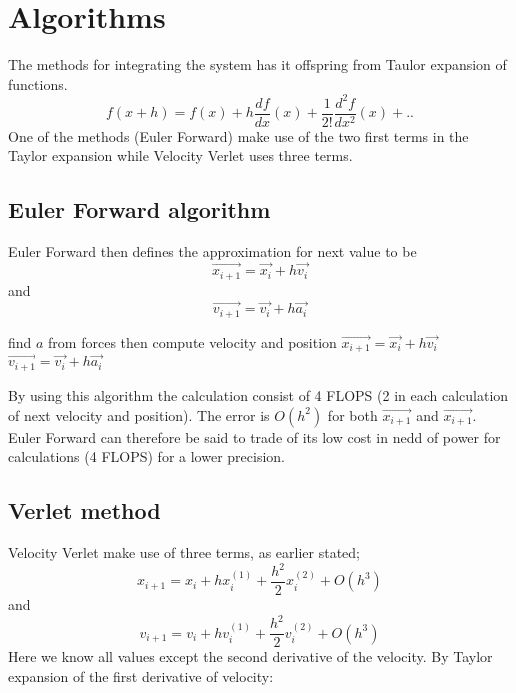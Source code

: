 \documentclass[twoside,twocolumn]{article}
\begin{document}
\section{Algorithms}
The methods for integrating the system has it offspring from Taulor expansion of functions. 
\[
f(x+h) = f(x) +h\frac{df}{dx}(x)+\frac{1}{2!}\frac{d^2f}{dx^2}(x) +..
\]
One of the methods (Euler Forward) make use of the two first terms in the Taylor expansion while Velocity Verlet uses three terms. 
\subsection{Euler Forward algorithm}
Euler Forward then defines the approximation for next value to be
\begin{equation}
\vec{  x_{i+1}} = \vec{x_{i}} + h \vec{v_i}
\end{equation}
and
\begin{equation}
\vec{  v_{i+1}} = \vec{v_{i}} + h \vec{a_i}
\end{equation}

\begin{algorithmic}[H]

\State find $a$ from forces
\State then compute velocity and position
\State $\vec{  x_{i+1}} = \vec{x_{i}} + h \vec{v_i}$
\State $\vec{  v_{i+1}} = \vec{v_{i}} + h \vec{a_i}$
\EndFor
\end{algorithmic}
By using this algorithm the calculation consist of 4 FLOPS (2 in each calculation of next velocity and position). The error is $O(h^2)$ for both $ \vec{  x_{i+1}}$ and $\vec{  x_{i+1}}$. Euler Forward can therefore be said to trade of its low cost in nedd of power for calculations (4 FLOPS) for a lower precision.

\subsection{Verlet method}
Velocity Verlet make use of three terms, as earlier stated;
\begin{equation}\label{eq:verlet1}
 x_{i+1} =x_{i}+ h x_{i}^{(1)} +\frac{h^2}{2} x_{i}^{(2)} + O(h^3)
\end{equation}
and
\begin{equation} \label{eq:verlet2}
v_{i+1} =v_{i}+ h v_{i}^{(1)}+\frac{h^2}{2} v_{i}^{(2)} + O(h^3)
\end{equation}
Here we know all values except the second derivative of the velocity. By Taylor expansion of the first derivative of velocity:
\end{document}
